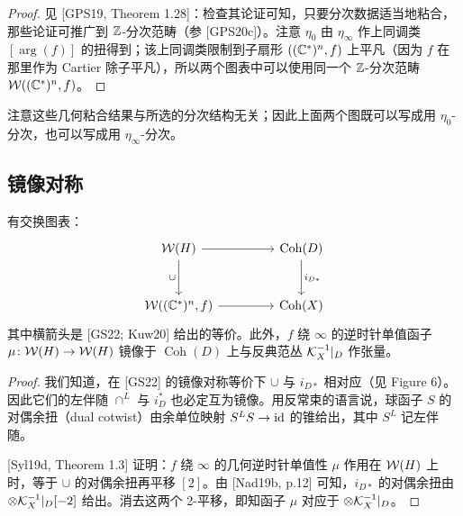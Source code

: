 
\begin{proof}
见 [GPS19, Theorem 1.28]：检查其论证可知，只要分次数据适当地粘合，那些论证可推广到 $\mathbb{Z}$-分次范畴（参 [GPS20c]）。注意 $\eta_0$ 由 $\eta_\infty$ 作上同调类 $[\arg(f)]$ 的扭得到；该上同调类限制到子扇形 $((\mathbb{C}^*)^n,f)$ 上平凡（因为 $f$ 在那里作为 Cartier 除子平凡），所以两个图表中可以使用同一个 $\mathbb{Z}$-分次范畴 $\mathcal{W}((\mathbb{C}^*)^n,f)$。
\end{proof}

\begin{remarkx}\label{rem:11}
注意这些几何粘合结果与所选的分次结构无关；因此上面两个图既可以写成用 $\eta_0$-分次，也可以写成用 $\eta_\infty$-分次。
\end{remarkx}

\subsection{镜像对称}

\begin{proposition}\label{prop:7-2-1}
有交换图表：
\[
\begin{tikzcd}[column sep=4.4em, row sep=2.8em]
\cW(H) \arrow[r] \arrow[d, "\cup"'] & \operatorname{Coh}(D) \arrow[d, "i_{D*}"] \\
\cW((\C^*)^n,f) \arrow[r] & \operatorname{Coh}(X)
\end{tikzcd}
\]
其中横箭头是 [GS22; Kuw20] 给出的等价。此外，$f$ 绕 $\infty$ 的逆时针单值函子 $\mu\colon\mathcal{W}(H)\to\mathcal{W}(H)$ 镜像于 $\operatorname{Coh}(D)$ 上与反典范丛 $\mathcal{K}_X^{-1}|_D$ 作张量。
\end{proposition}


\begin{proof}
我们知道，在 [GS22] 的镜像对称等价下 $\cup$ 与 $i_{D*}$ 相对应（见 Figure 6）。因此它们的左伴随 $\cap^L$ 与 $i_D^*$ 也必定互为镜像。用反常束的语言说，球函子 $S$ 的对偶余扭（dual cotwist）由余单位映射 $S^LS\to\mathrm{id}$ 的锥给出，其中 $S^L$ 记左伴随。

[Syl19d, Theorem 1.3] 证明：$f$ 绕 $\infty$ 的几何逆时针单值性 $\mu$ 作用在 $\mathcal{W}(H)$ 上时，等于 $\cup$ 的对偶余扭再平移 $[2]$。由 [Nad19b, p.12] 可知，$i_{D*}$ 的对偶余扭由 $\otimes\mathcal{K}_X^{-1}|_D[-2]$ 给出。消去这两个 2-平移，即知函子 $\mu$ 对应于 $\otimes\mathcal{K}_X^{-1}|_D$。
\end{proof}

